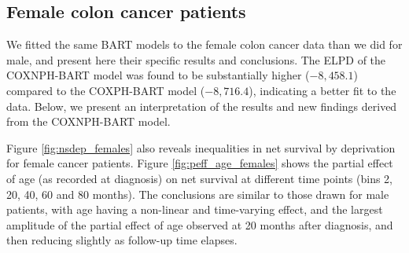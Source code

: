 \documentclass[12pt]{article}
\begin{document}
\subsection{Female colon cancer patients}

We fitted the same BART models to the female colon cancer data than we did for male, and present here their specific results and conclusions.
The ELPD of the COXNPH-BART model was found to be substantially higher ($-8,458.1$) compared to the COXPH-BART model ($-8,716.4$), indicating a better fit to the data. Below, we present an interpretation of the results and new findings derived from the COXNPH-BART model.

Figure \ref{fig:nsdep_females} also reveals inequalities in net survival by deprivation for female cancer patients.
Figure \ref{fig:peff_age_females} shows the partial effect of age (as recorded at diagnosis) on net survival at different time points (bins 2, 20, 40, 60 and 80 months). The conclusions are similar to those drawn for male patients, with age having a non-linear and time-varying effect, and the largest amplitude of the partial effect of age observed at 20 months after diagnosis, and then reducing slightly as follow-up time elapses.
\end{document}
